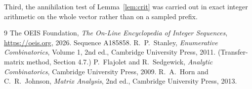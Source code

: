 \documentclass[11pt,a4paper]{article}
\theoremstyle{plain}
\theoremstyle{definition}
\begin{document}
Third, the annihilation test of Lemma~\ref{lem:crit} was carried out in exact integer
arithmetic on the whole vector rather than on a sampled prefix.

\begin{thebibliography}{9}
 The OEIS Foundation, \emph{The On-Line Encyclopedia of Integer
Sequences}, \url{https://oeis.org}, 2026. Sequence A185858.
 R.~P.~Stanley, \emph{Enumerative Combinatorics}, Volume 1, 2nd ed.,
Cambridge University Press, 2011. (Transfer-matrix method, Section 4.7.)
 P.~Flajolet and R.~Sedgewick, \emph{Analytic Combinatorics}, Cambridge
University Press, 2009.
 R.~A.~Horn and C.~R.~Johnson, \emph{Matrix Analysis}, 2nd ed., Cambridge
University Press, 2013.
\end{thebibliography}
\end{document}
